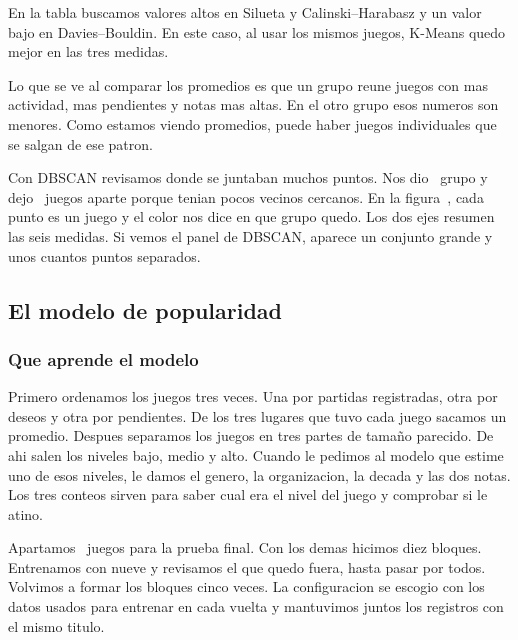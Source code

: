 
\SilTitulo

En la tabla buscamos valores altos en Silueta y Calinski--Harabasz y un valor bajo en Davies--Bouldin. En este caso, al usar los mismos juegos, K-Means quedo mejor en las tres medidas.

\Perfiles
Lo que se ve al comparar los promedios es que un grupo reune juegos con mas actividad, mas pendientes y notas mas altas. En el otro grupo esos numeros son menores. Como estamos viendo promedios, puede haber juegos individuales que se salgan de ese patron.

Con DBSCAN revisamos donde se juntaban muchos puntos. Nos dio \GruposDbscan\ grupo y dejo \RuidoDbscan\ juegos aparte porque tenian pocos vecinos cercanos. En la figura~, cada punto es un juego y el color nos dice en que grupo quedo. Los dos ejes resumen las seis medidas. Si vemos el panel de DBSCAN, aparece un conjunto grande y unos cuantos puntos separados.


\subsection{El modelo de popularidad}
\subsubsection{Que aprende el modelo}
Primero ordenamos los juegos tres veces. Una por partidas registradas, otra por deseos y otra por pendientes. De los tres lugares que tuvo cada juego sacamos un promedio. Despues separamos los juegos en tres partes de tamaño parecido. De ahi salen los niveles bajo, medio y alto. Cuando le pedimos al modelo que estime uno de esos niveles, le damos el genero, la organizacion, la decada y las dos notas. Los tres conteos sirven para saber cual era el nivel del juego y comprobar si le atino.

Apartamos \JuegosPrueba\ juegos para la prueba final. Con los demas hicimos diez bloques. Entrenamos con nueve y revisamos el que quedo fuera, hasta pasar por todos. Volvimos a formar los bloques cinco veces. La configuracion se escogio con los datos usados para entrenar en cada vuelta y mantuvimos juntos los registros con el mismo titulo.

